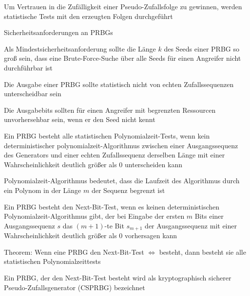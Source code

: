 \documentclass[a4paper]{article}
\begin{document}
\begin{multicols}{3}
\begin{itemize*}
            \item Um Vertrauen in die Zufälligkeit einer Pseudo-Zufallsfolge zu gewinnen, werden statistische Tests mit den erzeugten Folgen durchgeführt
            \item Sicherheitsanforderungen an PRBGs
            \begin{itemize*}
                  \item Als Mindestsicherheitsanforderung sollte die Länge $k$ des Seeds einer PRBG so groß sein, dass eine Brute-Force-Suche über alle Seeds für einen Angreifer nicht durchführbar ist
                  \item Die Ausgabe einer PRBG sollte statistisch nicht von echten Zufallssequenzen unterscheidbar sein
                  \item Die Ausgabebits sollten für einen Angreifer mit begrenzten Ressourcen unvorhersehbar sein, wenn er den Seed nicht kennt
            \end{itemize*}
            \item Ein PRBG besteht alle statistischen Polynomialzeit-Tests, wenn kein deterministischer polynomialzeit-Algorithmus zwischen einer Ausgangssequenz des Generators und einer echten Zufallssequenz derselben Länge mit einer Wahrscheinlichkeit deutlich größer als $0$ unterscheiden kann
            \item Polynomialzeit-Algorithmus bedeutet, dass die Laufzeit des Algorithmus durch ein Polynom in der Länge $m$ der Sequenz begrenzt ist
            \item Ein PRBG besteht den Next-Bit-Test, wenn es keinen deterministischen Polynomialzeit-Algorithmus gibt, der bei Eingabe der ersten $m$ Bits einer Ausgangssequenz $s$ das $(m+1)$-te Bit $s_{m+1}$ der Ausgangssequenz mit einer Wahrscheinlichkeit deutlich größer als $0$ vorhersagen kann
            \item Theorem: Wenn eine PRBG den Next-Bit-Test $\Leftrightarrow$ besteht, dann besteht sie alle statistischen Polynomialzeittests
            \item Ein PRBG, der den Next-Bit-Test besteht wird als kryptographisch sicherer Pseudo-Zufallsgenerator (CSPRBG) bezeichnet
      \end{itemize*}


\end{multicols}
\end{document}
